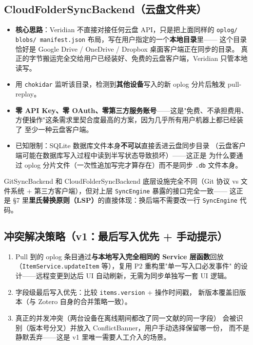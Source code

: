 \documentclass[12pt, a4paper]{article}
\begin{document}
\subsection{CloudFolderSyncBackend（云盘文件夹）}

\begin{itemize}[leftmargin=2em, itemsep=2pt]
  \item \textbf{核心思路}：Veridian 不直接对接任何云盘 API，只是把上面同样的
        \texttt{oplog/ blobs/ manifest.json} 布局，写在用户指定的一个\textbf{本地目录}里——
        这个目录恰好是 Google Drive / OneDrive / Dropbox 桌面客户端正在同步的目录。
        真正的字节搬运完全交给用户已经装好、免费的云盘客户端，Veridian 只管本地读写。
  \item 用 \texttt{chokidar} 监听该目录，检测到\textbf{其他设备}写入的新 oplog 分片后触发 pull-replay。
  \item \textbf{零 API Key、零 OAuth、零第三方服务账号}——这是"免费、不承担费用、
        方便操作"这条需求里契合度最高的方案，因为几乎所有用户机器上都已经装了
        至少一种云盘客户端。
  \item 已知限制：SQLite 数据库文件本身\textbf{不可以}直接丢进云盘同步目录
        （云盘客户端可能在数据库写入过程中读到半写状态导致损坏）——这正是
        为什么要通过 oplog 分片文件（一次性追加写完才算存在）而不是同步
        \texttt{.db} 文件本身。
\end{itemize}

\begin{tcolorbox}[fixbox, title={对比：为什么两个后端接口能长得一模一样}]
  GitSyncBackend 和 CloudFolderSyncBackend 底层设施完全不同（Git 协议 vs 文件系统 +
  第三方客户端），但对上层 \texttt{SyncEngine} 暴露的接口完全一致——
  这正是 \S 7 里\textbf{里氏替换原则（LSP）}的直接体现：换后端不需要改一行
  \texttt{SyncEngine} 代码。
\end{tcolorbox}

\subsection{冲突解决策略（v1：最后写入优先 + 手动提示）}

\begin{enumerate}[leftmargin=2em, itemsep=2pt]
  \item Pull 到的 oplog 条目通过\textbf{与本地写入完全相同的 Service 层函数}回放
        （\texttt{ItemService.updateItem} 等），复用 P2 重构里"单一写入口必发事件"
        的设计——远程变更到达后 UI 自动刷新，无需为同步单独写一套 UI 逻辑。
  \item 字段级最后写入优先：比较 \texttt{items.version} + 操作时间戳，
        新版本覆盖旧版本（与 Zotero 自身的合并策略一致）。
  \item 真正的并发冲突（两台设备在离线期间都改了同一文献的同一字段）
        会被识别（版本号分叉）并放入 ConflictBanner，用户手动选择保留哪一份，
        而不是静默丢弃——这是 v1 里唯一需要人工介入的场景。
\end{enumerate}
\end{document}

